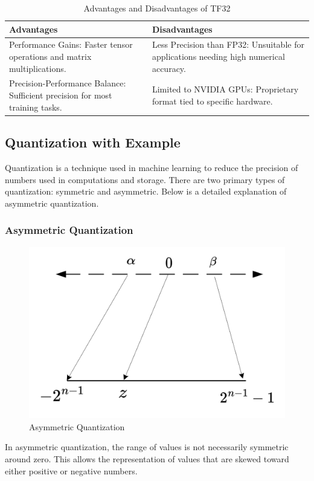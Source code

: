 \documentclass{ioereport}
\begin{document}
\begin{enumerate}[label=\textbf{\roman*.}]
    \begin{table}[H]
        \centering
        \caption{Advantages and Disadvantages of TF32}
        \label{tab:tf32}
        \begin{tabular}{|p{6cm}|p{6cm}|}
        \hline
        \textbf{Advantages} & \textbf{Disadvantages} \\
        \hline
        Performance Gains: Faster tensor operations and matrix multiplications. & Less Precision than FP32: Unsuitable for applications needing high numerical accuracy. \\
        \hline
        Precision-Performance Balance: Sufficient precision for most training tasks. & Limited to NVIDIA GPUs: Proprietary format tied to specific hardware. \\
        \hline
        \end{tabular}
        \end{table}
        
\end{enumerate}

\pagebreak


\setcounter{subsection}{5}
\subsection{Quantization with Example}
\label{app:quantization-manual-conversion}

Quantization is a technique used in machine learning to reduce the precision of numbers used in computations and storage. There are two primary types of quantization: symmetric and asymmetric. Below is a detailed explanation of asymmetric quantization.

\subsubsection{Asymmetric Quantization}
\begin{figure}[H]
    \centering
    \includegraphics[width=0.7\linewidth]{assets/quantization/Unsymmetric_Qfigure.png}
    \caption{Asymmetric Quantization}
    \label{fig:Unsymmetric_Qfigure}
\end{figure}
In asymmetric quantization, the range of values is not necessarily symmetric around zero. This allows the representation of values that are skewed toward either positive or negative numbers.
\end{document}
